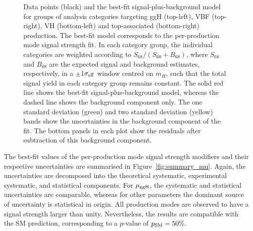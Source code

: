 \begin{figure}[htbp]
{    Data points (black) and the best-fit signal-plus-background model for groups of analysis categories targeting ggH (top-left), VBF (top-right), VH (bottom-left) and top-associated (bottom-right) production. The best-fit model corresponds to the per-production mode signal strength fit. In each category group, the individual categories are weighted according to $S_{68}/(S_{68}+B_{68})$, where $S_{68}$ and $B_{68}$ are the expected signal and background estimates, respectively, in a $\pm$1$\sigma_{\rm{eff}}$ window centred on $m_H$, such that the total signal yield in each category group remains constant. The solid red line shows the best-fit signal-plus-background model, whereas the dashed line shows the background component only. The one standard deviation (green) and two standard deviation (yellow) bands show the uncertainties in the background component of the fit. The bottom panels in each plot show the residuals after subtraction of this background component.
  }
  \label{fig:sb_mu}
\end{figure}

The best-fit values of the per-production mode signal strength modifiers and their respective uncertainties are summarised in Figure~\ref{fig:summary_mu}. Again, the uncertainties are decomposed into the theoretical systematic, experimental systematic, and statistical components. For $\mu_{\rm{ggH}}$, the systematic and statistical uncertainties are comparable, whereas for other parameters the dominant source of uncertainty is statistical in origin. All production modes are observed to have a signal strength larger than unity. Nevertheless, the results are compatible with the SM prediction, corresponding to a $p$-value of $p_{\rm{SM}}=50\%$.

